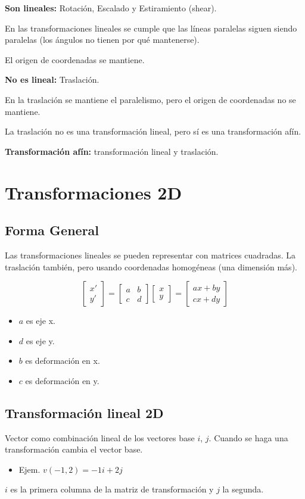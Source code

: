 \textbf{Son lineales:} Rotación, Escalado y Estiramiento (shear).

En las transformaciones lineales se cumple que las líneas paralelas siguen siendo paralelas (los ángulos no tienen por qué mantenerse).

El origen de coordenadas se mantiene.

\textbf{No es lineal:} Traslación.

En la traslación se mantiene el paralelismo, pero el origen de coordenadas no se mantiene.

La traslación no es una transformación lineal, pero sí es una transformación afín.

\textbf{Transformación afín:} transformación lineal y traslación.

\section{Transformaciones 2D}
\subsection{Forma General}
Las transformaciones lineales se pueden representar con matrices cuadradas. La traslación también, pero usando coordenadas homogéneas (una dimensión más).

$$\left[\begin{matrix}
x' \\ y'
\end{matrix}\right] =
\left[\begin{matrix}
a & b \\ c & d
\end{matrix}\right]
\left[\begin{matrix}
x \\ y
\end{matrix}\right]=
\left[\begin{matrix}
ax+by \\ cx+dy
\end{matrix}\right]$$
\begin{itemize}
    \item $a$ es eje x.
    \item $d$ es eje y.
    \item $b$ es deformación en x.
    \item $c$ es deformación en y.
\end{itemize}

\subsection{Transformación lineal 2D}
Vector como combinación lineal de los vectores base $i$, $j$. Cuando se haga una transformación cambia el vector base.
\begin{itemize}
    \item Ejem. $v (-1,2) = -1 i + 2 j$
\end{itemize} 
$i$ es la primera columna de la matriz de transformación y $j$ la segunda.

